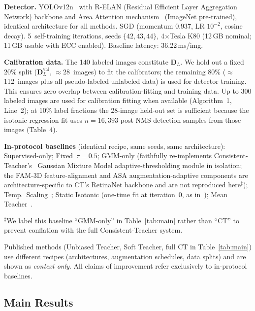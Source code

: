 \documentclass[10pt,twocolumn,letterpaper]{article}
\begin{document}
\textbf{Detector.}
YOLOv12n~\cite{yolov12} with R-ELAN (Residual Efficient Layer Aggregation
Network) backbone and Area Attention mechanism~\cite{yolov12}
(ImageNet pre-trained), identical architecture for all methods.
SGD (momentum 0.937, LR $10^{-2}$, cosine decay).
5~self-training iterations, seeds $\{42,43,44\}$,
4$\times$Tesla K80 (12\,GB nominal; 11\,GB usable with ECC enabled).
Baseline latency: 36.22\,ms/img.

\textbf{Calibration data.}
The 140 labeled images constitute $\mathbf{D}_L$. We hold out a fixed
20\% split ($\mathbf{D}_L^\text{val}$, $\approx$28~images) to fit the
calibrators; the remaining 80\% ($\approx$112~images plus all pseudo-labeled
unlabeled data) is used for detector training. This ensures zero overlap
between calibration-fitting and training data. Up to 300 labeled images
are used for calibration fitting when available (Algorithm~1, Line~2);
at 10\% label fractions the 28-image held-out set is sufficient because
the isotonic regression fit uses $n{=}16{,}393$ post-NMS
detection samples from those images (Table~4).

\textbf{In-protocol baselines} (identical recipe, same seeds, same architecture):
Supervised-only; Fixed~$\tau{=}0.5$; GMM-only (faithfully re-implements
Consistent-Teacher's~\cite{consistentteacher2023} Gaussian Mixture Model
adaptive-thresholding module in isolation; the FAM-3D feature-alignment and
ASA augmentation-adaptive components are architecture-specific to CT's
RetinaNet backbone and are not reproduced here$^\ddagger$);
Temp.\ Scaling~\cite{guo2017calibration}; Static Isotonic (one-time fit at
iteration~0, as in~\cite{kuzucu2024calibration}); Mean
Teacher~\cite{tarvainen2017mean}.

\footnotesize{$^\ddagger$We label this baseline ``GMM-only'' in Table~\ref{tab:main}
rather than ``CT'' to prevent conflation with the full Consistent-Teacher system.}\normalsize

Published methods (Unbiased Teacher, Soft Teacher, full CT in Table~\ref{tab:main})
use different recipes (architectures, augmentation schedules, data splits) and
are shown as \emph{context only}. All claims of improvement refer exclusively to
in-protocol baselines.

\subsection{Main Results}
\end{document}
